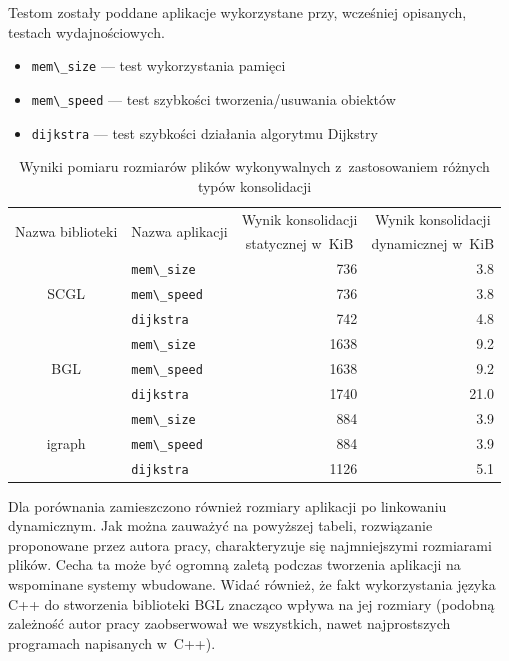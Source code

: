 \documentclass[a4paper,12pt,polish,twoside,openright]{thesis}
\newcommand\code[1]{\lstinline[style=line]{#1}}
\begin{document}
Testom zostały poddane aplikacje wykorzystane przy, wcześniej opisanych, testach wydajnościowych.
\begin{itemize}
	\item \code{mem\_size} --- test wykorzystania pamięci
	\item \code{mem\_speed} --- test szybkości tworzenia/usuwania obiektów
	\item \code{dijkstra} --- test szybkości działania algorytmu Dijkstry
\end{itemize}
\begin{table}[htb]
\caption{Wyniki pomiaru rozmiarów plików wykonywalnych z~zastosowaniem różnych typów konsolidacji}
\label{tab:static}
\centering
\begin{tabular}{ | c | l | r | r |}
	\hline
	\multirow{2}{*}{Nazwa biblioteki} & \multirow{2}{*}{Nazwa aplikacji} & \multicolumn{1}{|c|}{Wynik konsolidacji} & \multicolumn{1}{|c|}{Wynik konsolidacji} \\
		& & \multicolumn{1}{|c|}{statycznej w~KiB} & \multicolumn{1}{|c|}{dynamicznej w~KiB} \\
	\hline \hline
	\multirow{3}{*}{SCGL}   & \code{mem\_size}  & 736   & 3.8   \\ \cline{2-4}
							& \code{mem\_speed} & 736   & 3.8   \\ \cline{2-4}
							& \code{dijkstra}   & 742   & 4.8   \\ \hline
	\multirow{3}{*}{BGL}    & \code{mem\_size}  & 1638  & 9.2   \\ \cline{2-4}
							& \code{mem\_speed} & 1638  & 9.2   \\ \cline{2-4}
							& \code{dijkstra}   & 1740  & 21.0  \\ \hline
	\multirow{3}{*}{igraph} & \code{mem\_size}  & 884   & 3.9   \\ \cline{2-4}
							& \code{mem\_speed} & 884   & 3.9   \\ \cline{2-4}
							& \code{dijkstra}   & 1126  & 5.1   \\ \hline
\end{tabular}
\end{table}
Dla porównania zamieszczono również rozmiary aplikacji po linkowaniu dynamicznym.
Jak można zauważyć na powyższej tabeli, rozwiązanie proponowane przez autora pracy, charakteryzuje się najmniejszymi rozmiarami plików. Cecha ta może być ogromną zaletą podczas tworzenia aplikacji na wspominane systemy wbudowane.
Widać również, że fakt wykorzystania języka C++ do stworzenia biblioteki BGL znacząco wpływa na jej rozmiary (podobną zależność autor pracy zaobserwował we wszystkich, nawet najprostszych programach napisanych w~C++).
\end{document}
